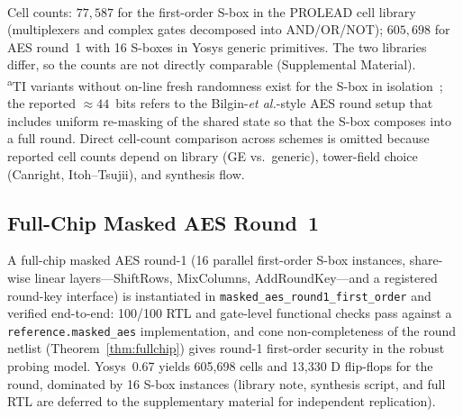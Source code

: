 \documentclass[lettersize,journal]{IEEEtran}
\begin{document}
\begin{table}[t]
\centering
\caption{Gate-level synthesis results for our first-order construction
(Yosys~0.67, generic cell library).}
\label{tab:cost}
\\[2pt]
{\footnotesize Cell counts: $77{,}587$ for the first-order S-box in the
PROLEAD cell library (multiplexers and complex gates decomposed into
AND/OR/NOT); $605{,}698$ for AES round~1 with 16 S-boxes in Yosys generic
primitives. The two libraries differ, so the counts are not directly
comparable (Supplemental Material).\\[2pt]}
{\footnotesize\textsuperscript{a}TI variants without on-line fresh randomness exist for
the S-box in isolation~\cite{nikova2006threshold}; the reported
$\approx 44$~bits refers to the Bilgin-\emph{et al.}-style AES round
setup that includes uniform re-masking of the shared state so that the
S-box composes into a full round. Direct cell-count comparison across
schemes is omitted because reported cell counts depend on library
(GE vs.\ generic), tower-field choice (Canright, Itoh--Tsujii), and
synthesis flow.}
\end{table}

\subsection{Full-Chip Masked AES Round~1}
\label{sec:fullchip}
A full-chip masked AES round-1 (16 parallel first-order S-box instances,
share-wise linear layers---ShiftRows, MixColumns, AddRoundKey---and a registered
round-key interface) is instantiated in
\texttt{masked\_aes\_round1\_first\_order} and verified end-to-end:
100/100 RTL and gate-level functional checks pass against a
\texttt{reference.masked\_aes} implementation, and cone non-completeness
of the round netlist (Theorem~\ref{thm:fullchip}) gives round-1 first-order
security in the robust probing model.  Yosys~0.67 yields 605{,}698
cells and 13{,}330 D flip-flops for the round, dominated by 16
S-box instances (library note, synthesis script, and full RTL are deferred
to the supplementary material for independent replication).
\end{document}
